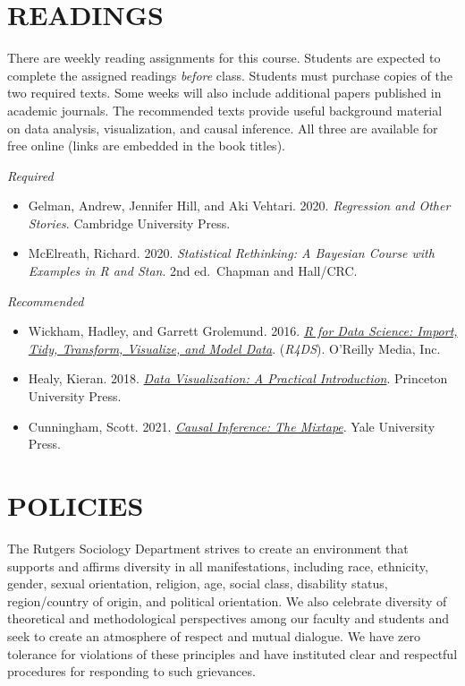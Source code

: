 \documentclass[
  10pt,
]{article}
\providecommand{\tightlist}{%
  \setlength{\itemsep}{0pt}\setlength{\parskip}{0pt}}
\begin{document}
\hypertarget{readings}{%
\section{READINGS}\label{readings}}

There are weekly reading assignments for this course. Students are
expected to complete the assigned readings \emph{before} class. Students
must purchase copies of the two required texts. Some weeks will also
include additional papers published in academic journals. The
recommended texts provide useful background material on data analysis,
visualization, and causal inference. All three are available for free
online (links are embedded in the book titles).

\emph{Required}

\begin{itemize}
\tightlist
\item
  Gelman, Andrew, Jennifer Hill, and Aki Vehtari. 2020. \emph{Regression
  and Other Stories}. Cambridge University Press.
\item
  McElreath, Richard. 2020. \emph{Statistical Rethinking: A Bayesian
  Course with Examples in R and Stan}. 2nd ed.~Chapman and Hall/CRC.
\end{itemize}

\emph{Recommended}

\begin{itemize}
\item
  Wickham, Hadley, and Garrett Grolemund. 2016.
  \textit{\href{https://r4ds.had.co.nz/}{R for Data Science: Import, Tidy, Transform, Visualize, and Model Data}}.
  (\emph{R4DS}). O'Reilly Media, Inc.
\item
  Healy, Kieran. 2018.
  \textit{\href{https://socviz.co/}{Data Visualization: A Practical Introduction}}.
  Princeton University Press.
\item
  Cunningham, Scott. 2021.
  \textit{\href{https://mixtape.scunning.com/}{Causal Inference: The Mixtape}}.
  Yale University Press.
\end{itemize}

\hypertarget{policies}{%
\section{POLICIES}\label{policies}}

The Rutgers Sociology Department strives to create an environment that
supports and affirms diversity in all manifestations, including race,
ethnicity, gender, sexual orientation, religion, age, social class,
disability status, region/country of origin, and political orientation.
We also celebrate diversity of theoretical and methodological
perspectives among our faculty and students and seek to create an
atmosphere of respect and mutual dialogue. We have zero tolerance for
violations of these principles and have instituted clear and respectful
procedures for responding to such grievances.
\end{document}
